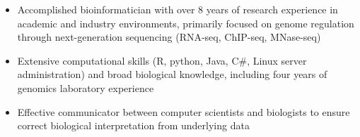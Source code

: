 

\begin{resentries}

\begin{itemize}[leftmargin=!]
	\setlength{\itemsep}{-1.5mm}
	\item{Accomplished bioinformatician with over 8 years of research experience in academic and industry environments, primarily focused on genome regulation through next-generation sequencing (RNA-seq, ChIP-seq, MNase-seq)}
	\item{Extensive computational skills (R, python, Java, C\#, Linux server administration) and broad biological knowledge, including four years of genomics laboratory experience}
	\item{Effective communicator between computer scientists and biologists to ensure correct biological interpretation from underlying data}

\end{itemize}

\end{resentries}
